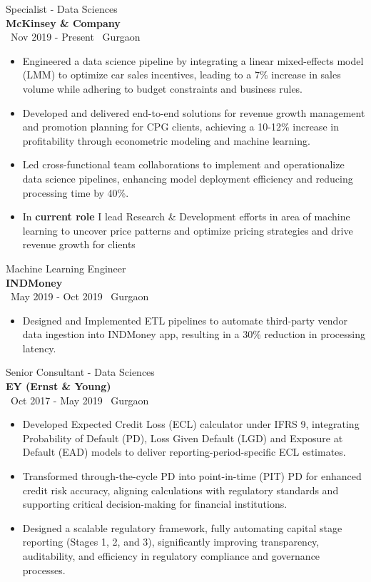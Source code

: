 \documentclass[a4paper,10pt]{article}
\begin{document}
{\large Specialist - Data Sciences} \\
\textbf{McKinsey \& Company} \\
\faCalendar \, Nov 2019 - Present \hfill \faMapMarker \, Gurgaon
\begin{itemize}[itemsep=1pt, topsep=0pt] %
    \item Engineered a data science pipeline by integrating a linear mixed-effects model (LMM) to optimize car sales incentives, leading to a 7\% increase in sales volume while adhering to budget constraints and business rules.
    \item Developed and delivered end-to-end solutions for revenue growth management and promotion planning for CPG clients, achieving a 10-12\% increase in profitability through econometric modeling and machine learning.
    \item Led cross-functional team collaborations to implement and operationalize data science pipelines, enhancing model deployment efficiency and reducing processing time by 40\%.
    \item In \textbf{current role} I lead Research \& Development efforts in area of machine learning to uncover price patterns and optimize pricing strategies and drive revenue growth for clients

\end{itemize}

{\large Machine Learning Engineer} \\
\textbf{INDMoney} \\
\faCalendar \, May 2019 - Oct 2019 \hfill \faMapMarker \, Gurgaon
\begin{itemize}[itemsep=1pt, topsep=0pt]
    \item Designed and Implemented ETL pipelines to automate third-party vendor data ingestion into INDMoney app, resulting in a 30\% reduction in processing latency.
\end{itemize}

{\large Senior Consultant - Data Sciences} \\
\textbf{EY (Ernst \& Young)} \\
\faCalendar \, Oct 2017 - May 2019 \hfill \faMapMarker \, Gurgaon
\begin{itemize}[itemsep=1pt, topsep=0pt]
    \item Developed Expected Credit Loss (ECL) calculator under IFRS 9, integrating Probability of Default (PD), Loss Given Default (LGD) and Exposure at Default (EAD) models to deliver reporting-period-specific ECL estimates.
    \item Transformed through-the-cycle PD into point-in-time (PIT) PD for enhanced credit risk accuracy, aligning calculations with regulatory standards and supporting critical decision-making for financial institutions.
    \item Designed a scalable regulatory framework, fully automating capital stage reporting (Stages 1, 2, and 3), significantly improving transparency, auditability, and efficiency in regulatory compliance and governance processes.
\end{itemize}
\end{document}
